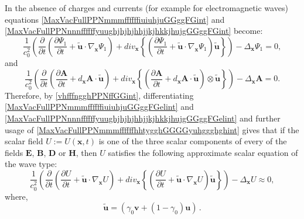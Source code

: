 \documentclass{article}
\theoremstyle{definition}
\theoremstyle{remark}
\renewcommand{\vec}[1]{\mathbf{#1}}
\newcommand{\er}{\eqref}
\newcommand{\er}{\eqref}
\begin{document}
In the absence of charges and currents (for example for
electromagnetic waves) equations
\er{MaxVacFullPPNmmmffffffiuiuhjuGGggFGint} and
\er{MaxVacFullPPNnnnffffffyuughjhjhjhhjjkjhkkjhujgGGggFGint} become:
\begin{equation}\label{MaxVacFullPPNmmmffffffiuiuhjuGGggFGelint}
\frac{1}{c^2_0}\left(\frac{\partial}{\partial
t}\left(\frac{\partial\Psi_1}{\partial t}+\vec {\tilde
u}\cdot\nabla_{\vec x}\Psi_1\right)+div_{\vec x}
\left\{\left(\frac{\partial\Psi_1}{\partial t}+\vec {\tilde
u}\cdot\nabla_{\vec x}\Psi_1\right)\vec {\tilde
u}\right\}\right)-\Delta_{\vec x}\Psi_1=0,
\end{equation}
and
\begin{equation}\label{MaxVacFullPPNnnnffffffyuughjhjhjhhjjkjhkkjhujgGGggFGelint}
\frac{1}{c^2_0}\left(\frac{\partial}{\partial
t}\left(\frac{\partial\vec A}{\partial t}+d_{\vec x}\vec A\cdot\vec
{\tilde u}\right)+div_{\vec x} \left\{\left(\frac{\partial\vec
A}{\partial t}+d_{\vec x}\vec A\cdot\vec {\tilde
u}\right)\otimes\vec {\tilde u}\right\}\right)-\Delta_{\vec x}\vec
A=0.
\end{equation}
Therefore, by \er{vhfffngghPPNffGGint}, differentiating
\er{MaxVacFullPPNmmmffffffiuiuhjuGGggFGelint} and
\er{MaxVacFullPPNnnnffffffyuughjhjhjhhjjkjhkkjhujgGGggFGelint} and
further usage of \er{MaxVacFullPPNmmmffffffhhtygghGGGGyuhggghghint}
gives that if the scalar field $U:=U(\vec x,t)$ is one of the three
scalar components of every of the fields $\vec E$, $\vec B$, $\vec
D$ or $\vec H$, then $U$ satisfies the following approximate scalar
equation of the wave type:
\begin{equation}\label{MaxVacFullPPNmmmffffffiuiuhjuGGggFGelGHGHGHGGint}
\frac{1}{c^2_0}\left(\frac{\partial}{\partial t}\left(\frac{\partial
U}{\partial t}+\vec {\tilde u}\cdot\nabla_{\vec x}U\right)+div_{\vec
x} \left\{\left(\frac{\partial U}{\partial t}+\vec {\tilde
u}\cdot\nabla_{\vec x} U\right)\vec {\tilde
u}\right\}\right)-\Delta_{\vec x}U \approx 0,
\end{equation}
where,
\begin{equation}\label{uyuyuyyint}
\vec {\tilde u}=\left(\gamma_0\vec v+(1-\gamma_0)\vec u\right)\,.
\end{equation}
\end{document}
